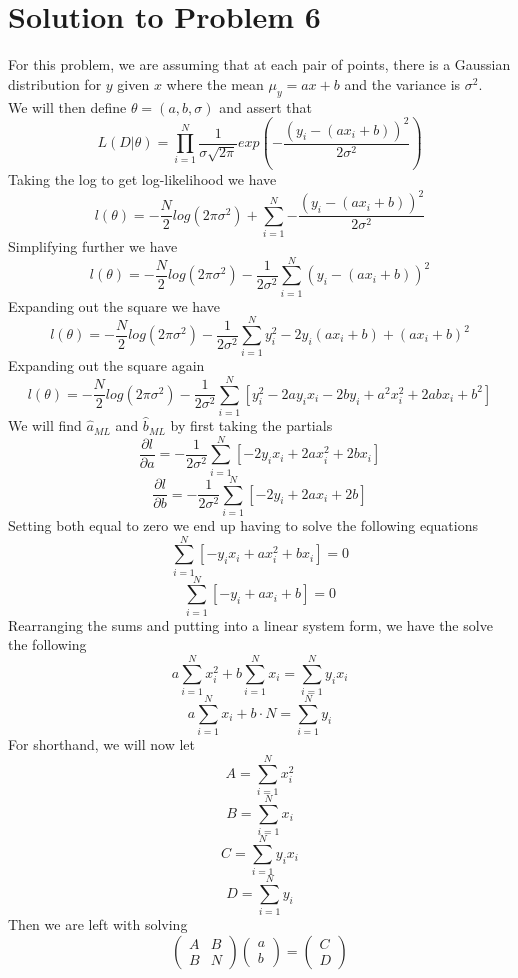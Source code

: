 \documentclass[11pt,psfig]{article}
\begin{document}
\newpage

\section*{Solution to Problem 6}

For this problem, we are assuming that at each pair of points, there is a Gaussian distribution for $y$ given $x$ where the mean $\mu_y = ax+b$ and the variance is $\sigma^2$.
\\
We will then define $\theta=(a,b,\sigma)$ and assert that
\[
L(D|\theta) = \prod_{i=1}^N{ \frac{1}{\sigma \sqrt{2\pi}} exp(-\frac{(y_i - (ax_i + b))^2}{2\sigma^2})}
\]
Taking the log to get log-likelihood we have
\[
l(\theta) = -\frac{N}{2} log(2\pi \sigma^2) + \sum_{i=1}^N{-\frac{(y_i - (ax_i + b))^2}{2\sigma^2}}
\]
Simplifying further we have
\[
l(\theta) = -\frac{N}{2} log(2\pi \sigma^2) - \frac{1}{2\sigma^2} \sum_{i=1}^N{(y_i - (ax_i + b))^2}
\]
Expanding out the square we have
\[
l(\theta) = -\frac{N}{2} log(2\pi \sigma^2) - \frac{1}{2\sigma^2} \sum_{i=1}^N{y_i^2 -2y_i (ax_i + b) + (ax_i + b)^2}
\]
Expanding out the square again
\[
l(\theta) = -\frac{N}{2} log(2\pi \sigma^2) - \frac{1}{2\sigma^2} \sum_{i=1}^N{[y_i^2 -2ay_i x_i -2by_i + a^2 x_i^2 + 2abx_i + b^2]}
\]
We will find $\hat{a}_{ML}$ and $\hat{b}_{ML}$ by first taking the partials
\[
\frac{\partial l}{\partial a} = - \frac{1}{2\sigma^2} \sum_{i=1}^N{[-2y_i x_i + 2a x_i^2 + 2bx_i]}
\]
\[
\frac{\partial l}{\partial b} = - \frac{1}{2\sigma^2} \sum_{i=1}^N{[-2y_i + 2a x_i + 2b]}
\]
Setting both equal to zero we end up having to solve the following equations
\[
\sum_{i=1}^N{[-y_i x_i + a x_i^2 + bx_i]} = 0
\]
\[
\sum_{i=1}^N{[-y_i + a x_i + b]} = 0
\]
Rearranging the sums and putting into a linear system form, we have the solve the following
\[
a\sum_{i=1}^N{x_i^2} + b\sum_{i=1}^N{x_i} = \sum_{i=1}^N{y_i x_i}
\]
\[
a\sum_{i=1}^N{x_i} + b \cdot N = \sum_{i=1}^N{y_i}
\]
For shorthand, we will now let
\[
A = \sum_{i=1}^N{x_i^2}
\]
\[
B = \sum_{i=1}^N{x_i}
\]
\[
C = \sum_{i=1}^N{y_i x_i}
\]
\[
D = \sum_{i=1}^N{y_i}
\]
Then we are left with solving
\[ \left( \begin{array}{ccc}
A & B \\
B & N \end{array} \right)
\left( \begin{array}{ccc}
a \\
b \end{array} \right)=
\left( \begin{array}{ccc}
C \\
D \end{array} \right)\]
\end{document}
